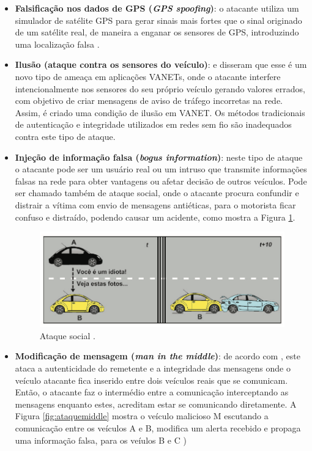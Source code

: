 \documentclass[
	12pt,				%
	oneside,			%
	a4paper,			%
	english,			%
	brazil				%
	]{abntex2ppgsi}
\begin{document}
\begin{itemize}
	\item {\textbf{Falsificação nos dados de GPS (\textit{GPS spoofing})}: o atacante utiliza um simulador de satélite GPS para gerar sinais  mais fortes que o sinal originado de um satélite real, de maneira a enganar os sensores de GPS, introduzindo uma localização falsa \cite{rawat2012vanet}.}
	
	\item {\textbf{Ilusão (ataque contra os sensores do veículo)}:  e  disseram que esse é um novo tipo de ameaça em aplicações VANETs, onde o atacante interfere intencionalmente  nos sensores do seu próprio veículo gerando valores errados, com objetivo de criar mensagens de aviso de tráfego incorretas na rede. Assim, é criado uma condição de ilusão em VANET. Os métodos tradicionais de autenticação e integridade utilizados em redes sem fio são inadequados contra este tipo de ataque.}
	
	\item {\textbf{Injeção de informação falsa (\textit{bogus information})}: neste tipo de ataque o atacante pode ser um usuário real ou um intruso que transmite informações falsas na rede para obter vantagens  ou afetar decisão de outros veículos. Pode ser chamado também de ataque social, onde o atacante  procura confundir e distrair a vítima com envio de mensagens antiéticas, para o motorista ficar confuso e distraído, podendo causar um acidente, como mostra a Figura  \ref{fig:ataquesocial}.	}
	
\begin{figure}[h!]
	\centering
	\includegraphics [width=12cm] {images/ataquesocial.png}
	\caption{Ataque social \cite{wanghamsegurancca}.}
	\label{fig:ataquesocial}
\end{figure}	

	\item {\textbf{Modificação de mensagem (\textit{man in the middle})}: de acordo com , este ataca a autenticidade do remetente e a integridade das mensagens onde o veículo atacante fica inserido entre dois veículos reais que se comunicam. Então, o atacante faz o intermédio entre a comunicação interceptando as mensagens enquanto estes, acreditam estar se comunicando diretamente.  A Figura \ref{fig:ataquemiddle}  mostra o veículo malicioso M escutando a comunicação entre os veículos A e B, modifica um alerta recebido e propaga uma informação falsa, para os veíulos B e C ) 	}


\end{itemize}
\end{document}
